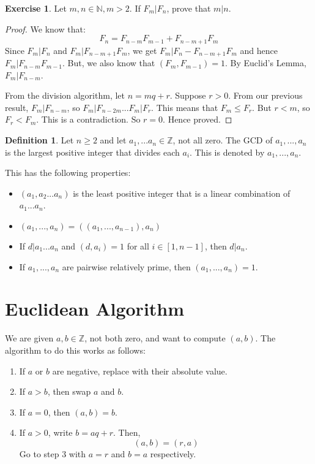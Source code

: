 \documentclass[12pt,letterpaper]{amsbook}
\theoremstyle{definition}
\newtheorem{definition}{Definition} %
\newtheorem*{exercise}{Exercise}
\newcommand{\N}{\mathbb{N}}
\newcommand{\Z}{\mathbb{Z}}
\begin{document}
\begin{exercise}
  Let $m, n \in \N, m > 2$. If $F_m|F_n$, prove that $m|n$.
\end{exercise}
\begin{proof}
  We know that:
  \[F_n = F_{n-m}F_{m-1} + F_{n-m+1}F_m\]
  Since $F_m|F_n$ and $F_m|F_{n-m+1}F_m$, we get $F_m|F_n-F_{n-m+1}F_m$ and hence $F_m|F_{n-m}F_{m-1}$. But, we also know that $(F_m,F_{m-1}) = 1$. By Euclid's Lemma, $F_m|F_{n-m}$.
  
  From the division algorithm, let $n = mq+r$. Suppose $r > 0$. From our previous result, $F_m|F_{n-m}$, so $F_m|F_{n-2m}...F_m|F_r$. This means that $F_m \leq F_r$. But $r < m$, so $F_r < F_m$. This is a contradiction. So $r = 0$. Hence proved.
\end{proof}

\begin{definition}
  Let $n \geq 2$ and let $a_1,...a_n \in \Z$, not all zero. The GCD of $a_1,...,a_n$ is the largest positive integer that divides each $a_i$. This is denoted by $a_1,...,a_n$.  
\end{definition}

This has the following properties:

\begin{itemize}
  \item $(a_1,a_2...a_n)$ is the least positive integer that is a linear combination of $a_1...a_n$.
  \item $(a_1,...,a_n) = ((a_1,...,a_{n-1}),a_n)$
  \item If $d | a_1...a_n$ and $(d,a_i) = 1$ for all $i \in [1,n-1]$, then $d|a_n$.
  \item If $a_1,...,a_n$ are pairwise relatively prime, then $(a_1,...,a_n) = 1$.
\end{itemize}

\section{Euclidean Algorithm}

We are given $a,b \in \Z$, not both zero, and want to compute $(a,b)$. The algorithm to do this works as follows:

\begin{enumerate}
  \item If $a$ or $b$ are negative, replace with their absolute value.
    \item If $a > b$, then swap $a$ and $b$.
    \item If $a = 0$, then $(a,b) = b$.
    \item If $a >0$, write $b = aq+r$. Then, 
      \[(a,b) = (r,a)\]
      Go to step 3 with $a = r$ and $b=a$ respectively.
\end{enumerate}
\end{document}
